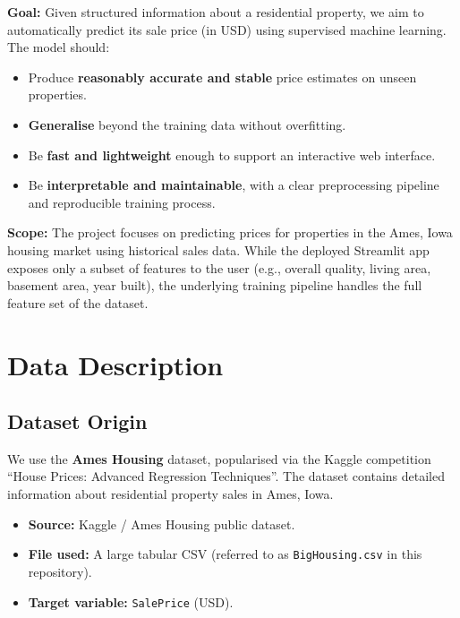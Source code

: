 \documentclass[11pt,a4paper]{article}
\begin{document}
\textbf{Goal:}
Given structured information about a residential property, we aim to automatically predict its sale price (in USD) using supervised machine learning.
The model should:

\begin{itemize}[leftmargin=*]
    \item Produce \textbf{reasonably accurate and stable} price estimates on unseen properties.
    \item \textbf{Generalise} beyond the training data without overfitting.
    \item Be \textbf{fast and lightweight} enough to support an interactive web interface.
    \item Be \textbf{interpretable and maintainable}, with a clear preprocessing pipeline and reproducible training process.
\end{itemize}

\noindent
\textbf{Scope:}
The project focuses on predicting prices for properties in the Ames, Iowa housing market using historical sales data.
While the deployed Streamlit app exposes only a subset of features to the user (e.g., overall quality, living area, basement area, year built), the underlying training pipeline handles the full feature set of the dataset.

\section{Data Description}

\subsection{Dataset Origin}

We use the \textbf{Ames Housing} dataset, popularised via the Kaggle competition ``House Prices: Advanced Regression Techniques''.
The dataset contains detailed information about residential property sales in Ames, Iowa.

\begin{itemize}[leftmargin=*]
    \item \textbf{Source:} Kaggle / Ames Housing public dataset.
    \item \textbf{File used:} A large tabular CSV (referred to as \texttt{BigHousing.csv} in this repository).
    \item \textbf{Target variable:} \texttt{SalePrice} (USD).
\end{itemize}
\end{document}
